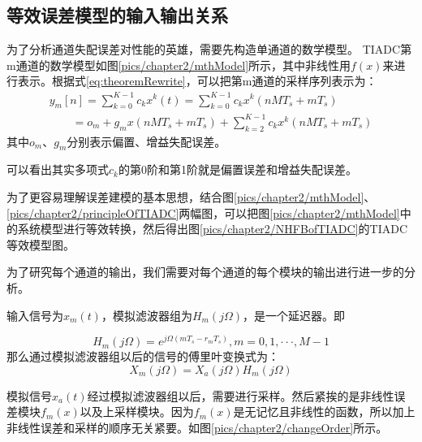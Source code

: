 	\subsection{等效误差模型的输入输出关系}
		为了分析通道失配误差对性能的英雄，需要先构造单通道的数学模型。
		TIADC第m通道的数学模型如图\ref{pics/chapter2/mthModel}所示，其中非线性用$f(x)$来进行表示。根据式\ref{eq:theoremRewrite}，可以把第m通道的采样序列表示为：
			\begin{equation}
				\begin{array}{l}
{y_m}\left[ n \right] = \sum\limits_{k = 0}^{K - 1} {{c_k}{x^k}\left( t \right)}  = \sum\limits_{k = 0}^{K - 1} {{c_k}{x^k}\left( {nM{T_s} + m{T_s}} \right)} \\
\,\,\,\,\,\,\,\,\,\,\,\, = {o_m} + {g_m}x\left( {nM{T_s} + m{T_s}} \right) + \sum\limits_{k = 2}^{K - 1} {{c_k}{x^k}\left( {nM{T_s} + m{T_s}} \right)} \label{eq:y_m}
\end{array}
			\end{equation}
		其中$o_m$、$g_m$分别表示偏置、增益失配误差。\par
		可以看出其实多项式$c_k$的第0阶和第1阶就是偏置误差和增益失配误差。\par
		为了更容易理解误差建模的基本思想，结合图\ref{pics/chapter2/mthModel}、\ref{pics/chapter2/principleOfTIADC}两幅图，可以把图\ref{pics/chapter2/mthModel}中的系统模型进行等效转换，然后得出图\ref{pics/chapter2/NHFBofTIADC}的TIADC等效模型图。
			
		
	为了研究每个通道的输出，我们需要对每个通道的每个模块的输出进行进一步的分析。
	\par
	输入信号为${x_m}(t)$，模拟滤波器组为${H_m}(j\Omega )$，是一个延迟器。即
	
		\begin{equation}
			{H_m}(j\Omega ) = {e^{j\Omega (m{T_s} - {r_m}{T_s})}},m = 0,1, \cdot  \cdot  \cdot ,M - 1
		\end{equation}
	那么通过模拟滤波器组以后的信号的傅里叶变换式为：
		\begin{equation}
			{X_m}\left( {j\Omega } \right) = {X_a}\left( {j\Omega } \right){H_m}\left( {j\Omega } \right)
		\end{equation}
		
	模拟信号${x_a}(t)$经过模拟滤波器组以后，需要进行采样。然后紧挨的是非线性误差模块$f_m(x)$以及上采样模块。因为$f_m(x)$是无记忆且非线性的函数，所以加上非线性误差和采样的顺序无关紧要。如图\ref{pics/chapter2/changeOrder}所示。
	
